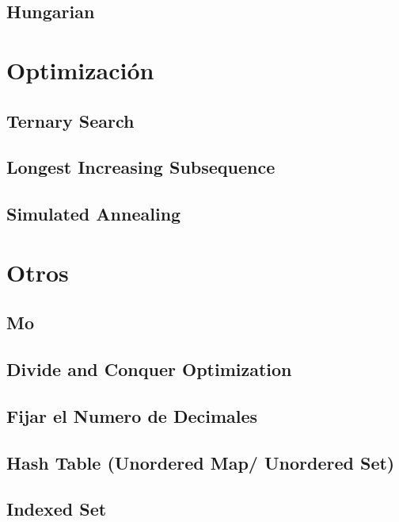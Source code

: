 \documentclass[a4paper,10pt,landscape,twocolumn]{article}
\begin{document}
\subsection{Hungarian}


\section{Optimización} %
\subsection{Ternary Search}

\subsection{Longest Increasing Subsequence}

\subsection{Simulated Annealing}


\section{Otros} %
\subsection{Mo}

\subsection{Divide and Conquer Optimization}

\subsection{Fijar el Numero de Decimales}

\subsection{Hash Table (Unordered Map/ Unordered Set)}

\subsection{Indexed Set}

\end{document}
